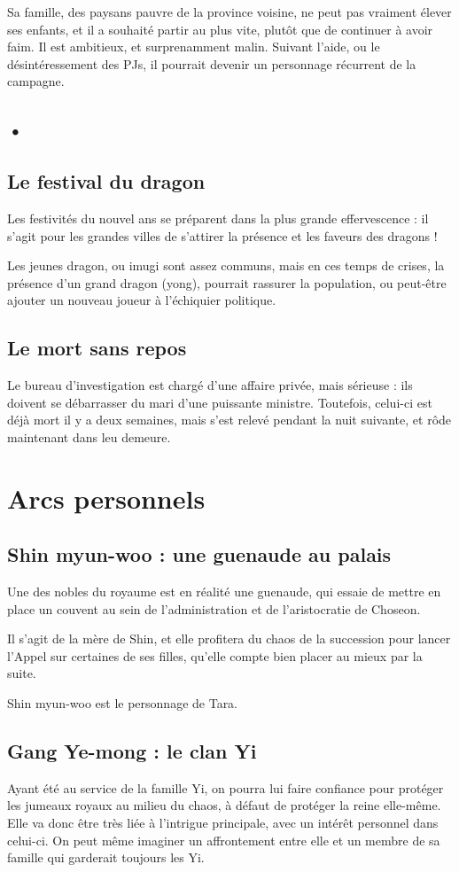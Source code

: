 \documentclass[10pt,a4paper]{book}
\begin{document}
Sa famille, des paysans pauvre de la province voisine, ne peut pas vraiment élever ses enfants, et il a souhaité partir au plus vite, plutôt que de continuer à avoir faim. Il est ambitieux, et surprenamment malin. Suivant l'aide, ou le désintéressement des PJs, il pourrait devenir un personnage récurrent de la campagne.

\subsection{•}
\subsection{Le festival du dragon}
Les festivités du nouvel ans se préparent dans la plus grande effervescence : il s'agit pour les grandes villes de s'attirer la présence et les faveurs des dragons !

Les jeunes dragon, ou imugi sont assez communs, mais en ces temps de crises, la présence d'un grand dragon (yong), pourrait rassurer la population, ou peut-être ajouter un nouveau joueur à l'échiquier politique.
\subsection{Le mort sans repos}
Le bureau d'investigation est chargé d'une affaire privée, mais sérieuse : ils doivent se débarrasser du mari d'une puissante ministre. Toutefois, celui-ci est déjà mort il y a deux semaines, mais s'est relevé pendant la nuit suivante, et rôde maintenant dans leu demeure.

\section{Arcs personnels}
\subsection{Shin myun-woo : une guenaude au palais}
Une des nobles du royaume est en réalité une guenaude, qui essaie de mettre en place un couvent au sein de l'administration et de l'aristocratie de Choseon.

Il s'agit de la mère de Shin, et elle profitera du chaos de la succession pour lancer l'Appel sur certaines de ses filles, qu'elle compte bien placer au mieux par la suite.

Shin myun-woo est le personnage de Tara.
\subsection{Gang Ye-mong : le clan Yi}
Ayant été au service de la famille Yi, on pourra lui faire confiance pour protéger les jumeaux royaux au milieu du chaos, à défaut de protéger la reine elle-même. Elle va donc être très liée à l'intrigue principale, avec un intérêt personnel dans celui-ci. On peut même imaginer un affrontement entre elle et un membre de sa famille qui garderait toujours les Yi.
\end{document}
